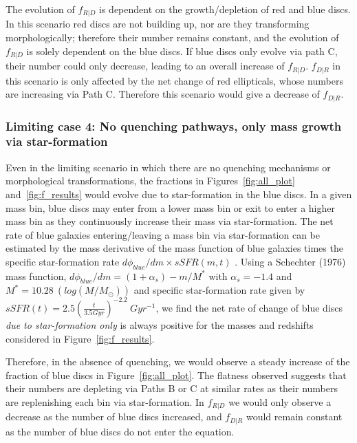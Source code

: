 \documentclass[useAMS,usenatbib]{mn2e}
\begin{document}
The evolution of $f_{R|D}$ is dependent on the growth/depletion of red and blue discs. In this scenario red discs are not building up, nor are they transforming morphologically; therefore their number remains constant, and the evolution of $f_{R|D}$ is solely dependent on the blue discs. If blue discs only evolve via path C, their number could only decrease, leading to an overall increase of $f_{R|D}$. 
$f_{D|R}$ in this scenario is only affected by the net change of red ellipticals, whose numbers are increasing via Path C. Therefore this scenario would give a decrease of $f_{D|R}$.%

\subsubsection{Limiting case 4: No quenching pathways, only mass growth via star-formation}

Even in the limiting scenario in which there are no quenching mechanisms or morphological transformations, the fractions in Figures~\ref{fig:all_plot} and~\ref{fig:f_results} would evolve due to star-formation in the blue discs. In a given mass bin, blue discs may enter from a lower mass bin or exit to enter a higher mass bin as they continuously increase their mass via star-formation. The net rate of blue galaxies entering/leaving a mass bin via star-formation can be estimated by the mass derivative of the mass function of blue galaxies times the specific star-formation rate $d\phi_{blue}/dm \times sSFR (m,t)$ \citep{Peng2010}. Using a Schechter (1976) mass function, $d\phi_{blue}/dm = (1+\alpha_s) - m/M^*$ with $\alpha_s = -1.4$ and $M^* = 10.28~(log(M/M_{\odot}))$ \citep{Ichikawa2017} and specific star-formation rate given by \citet{Peng2010} $sSFR(t) = 2.5(\frac{t}{3.5 Gyr})^{-2.2}~ Gyr^{-1}$, we find the net rate of change of blue discs \emph{due to star-formation only} is always positive for the masses and redshifts considered in Figure~\ref{fig:f_results}. 

Therefore, in the absence of quenching, we would observe a steady increase of the fraction of blue discs in Figure~\ref{fig:all_plot}. The flatness observed suggests that their numbers are depleting via Paths B or C at similar rates as their numbers are replenishing each bin via star-formation. In $f_{R|D}$ we would only observe a decrease as the number of blue discs increased, and $f_{D|R}$ would remain constant as the number of blue discs do not enter the equation.
\end{document}

